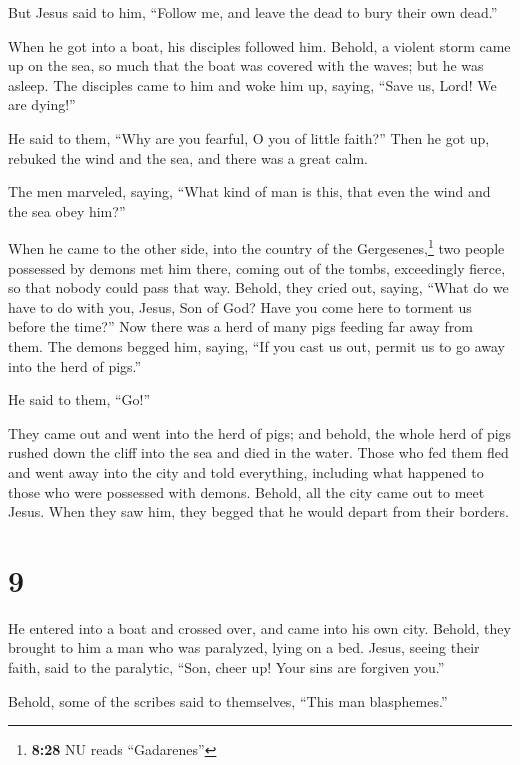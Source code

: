  But Jesus said to him, ``Follow me, and leave the dead
to bury their own dead.''

 When he got into a boat, his disciples followed him.
 Behold, a violent storm came up on the sea, so much that
the boat was covered with the waves; but he was asleep. 
The disciples came to him and woke him up, saying, ``Save us, Lord! We
are dying!''

 He said to them, ``Why are you fearful, O you of little
faith?'' Then he got up, rebuked the wind and the sea, and there was a
great calm.

 The men marveled, saying, ``What kind of man is this,
that even the wind and the sea obey him?''

 When he came to the other side, into the country of the
Gergesenes,\footnote{\textbf{8:28} NU reads ``Gadarenes''} two people
possessed by demons met him there, coming out of the tombs, exceedingly
fierce, so that nobody could pass that way.  Behold, they
cried out, saying, ``What do we have to do with you, Jesus, Son of God?
Have you come here to torment us before the time?''  Now
there was a herd of many pigs feeding far away from them.
 The demons begged him, saying, ``If you cast us out,
permit us to go away into the herd of pigs.''

 He said to them, ``Go!''

They came out and went into the herd of pigs; and behold, the whole herd
of pigs rushed down the cliff into the sea and died in the water.
 Those who fed them fled and went away into the city and
told everything, including what happened to those who were possessed
with demons.  Behold, all the city came out to meet
Jesus. When they saw him, they begged that he would depart from their
borders.

\hypertarget{section-8}{%
\section{9}\label{section-8}}

 He entered into a boat and crossed over, and came into
his own city.  Behold, they brought to him a man who was
paralyzed, lying on a bed. Jesus, seeing their faith, said to the
paralytic, ``Son, cheer up! Your sins are forgiven you.''

 Behold, some of the scribes said to themselves, ``This
man blasphemes.''

